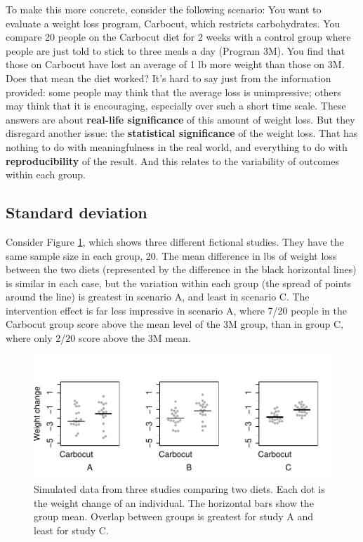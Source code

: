 \documentclass{krantz}
\begin{document}
To make this more concrete, consider the following scenario: You want to evaluate a weight loss program, Carbocut, which restricts carbohydrates. You compare 20 people on the Carbocut diet for 2 weeks with a control group where people are just told to stick to three meals a day (Program 3M). You find that those on Carbocut have lost an average of 1 lb more weight than those on 3M. Does that mean the diet worked? It's hard to say just from the information provided: some people may think that the average loss is unimpressive; others may think that it is encouraging, especially over such a short time scale. These answers are about \textbf{real-life significance} of this amount of weight loss. But they disregard another issue: the \textbf{statistical significance} of the weight loss. That has nothing to do with meaningfulness in the real world, and everything to do with \textbf{reproducibility} of the result. And this relates to the variability of outcomes within each group.

\hypertarget{standard-deviation}{%
\subsection{Standard deviation}\label{standard-deviation}}

Consider Figure \ref{fig:demo-variation}, which shows three different fictional studies. They have the same sample size in each group, 20. The mean difference in lbs of weight loss between the two diets (represented by the difference in the black horizontal lines) is similar in each case, but the variation within each group (the spread of points around the line) is greatest in scenario A, and least in scenario C. The intervention effect is far less impressive in scenario A, where 7/20 people in the Carbocut group score above the mean level of the 3M group, than in group C, where only 2/20 score above the 3M mean.

\begin{figure}
\includegraphics[width=0.9\linewidth]{images_bw/demo-variation} \caption{Simulated data from three studies comparing two diets. Each dot is the weight change of an individual. The horizontal bars show the group mean.  Overlap between groups is greatest for study A and least for study C.}\label{fig:demo-variation}
\end{figure}
\end{document}
